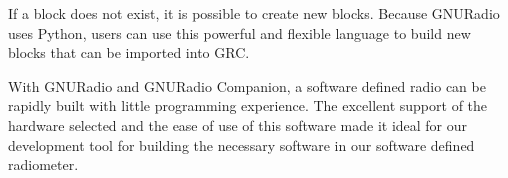 If a block does not exist, it is possible to create new blocks.  Because GNURadio uses Python, users can use this powerful and flexible language to build new blocks that can be imported into GRC.  



With GNURadio and GNURadio Companion, a software defined radio can be rapidly built with little programming experience.  The excellent support of the hardware selected and the ease of use of this software made it ideal for our development tool for building the necessary software in our software defined radiometer.






